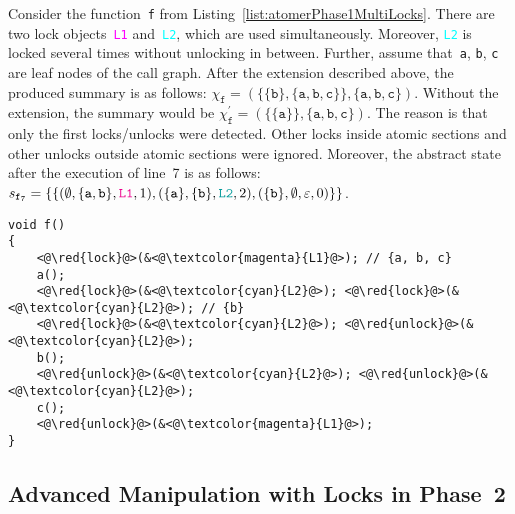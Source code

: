 \begin{example}
    Consider the function~\texttt{f} from Listing~\ref{list:atomerPhase1MultiLocks}. There are two lock objects~\textcolor{magenta}{\texttt{L1}} and~\textcolor{cyan}{\texttt{L2}}, which are used simultaneously. Moreover, \textcolor{cyan}{\texttt{L2}} is locked several times without unlocking in between. Further, assume that~\texttt{a}, \texttt{b}, \texttt{c} are leaf nodes of the call graph. After the extension described above, the produced summary is as follows: $ \chi_\mathtt{f} = (\{\{\mathtt{b}\}, \{\mathtt{a, b, c}\}\}, \{\mathtt{a, b, c}\}) $. Without the extension, the summary would be $ \chi_\mathtt{f}^\prime = (\{\{\mathtt{a}\}\}, \{\mathtt{a, b, c}\}) $. The reason is that only the first locks/unlocks were detected. Other locks inside atomic sections and other unlocks outside atomic sections were ignored. Moreover, the abstract state after the execution of line~7 is as follows: $ s_{\mathtt{f}_7} = \{\{(\emptyset, \{\mathtt{a, b}\}, \textcolor{magenta}{\mathtt{L1}}, 1), (\{\mathtt{a}\}, \{\mathtt{b}\}, \textcolor{cyan}{\mathtt{L2}}, 2), (\{\mathtt{b}\}, \emptyset, \varepsilon, 0)\}\} $.
\end{example}

\begin{lstlisting}[style=c, label={list:atomerPhase1MultiLocks}, float=hbt, caption={A~code snippet used to illustrate the \emph{advanced manipulation with locks} during the first phase of the analysis}]
void f()
{
    <@\red{lock}@>(&<@\textcolor{magenta}{L1}@>); // {a, b, c}
    a();
    <@\red{lock}@>(&<@\textcolor{cyan}{L2}@>); <@\red{lock}@>(&<@\textcolor{cyan}{L2}@>); // {b}
    <@\red{lock}@>(&<@\textcolor{cyan}{L2}@>); <@\red{unlock}@>(&<@\textcolor{cyan}{L2}@>);
    b();
    <@\red{unlock}@>(&<@\textcolor{cyan}{L2}@>); <@\red{unlock}@>(&<@\textcolor{cyan}{L2}@>);
    c();
    <@\red{unlock}@>(&<@\textcolor{magenta}{L1}@>);
}
\end{lstlisting}

\subsection{Advanced Manipulation with Locks in Phase~2}
\label{sec:proposalMultiLocksPhase2}

